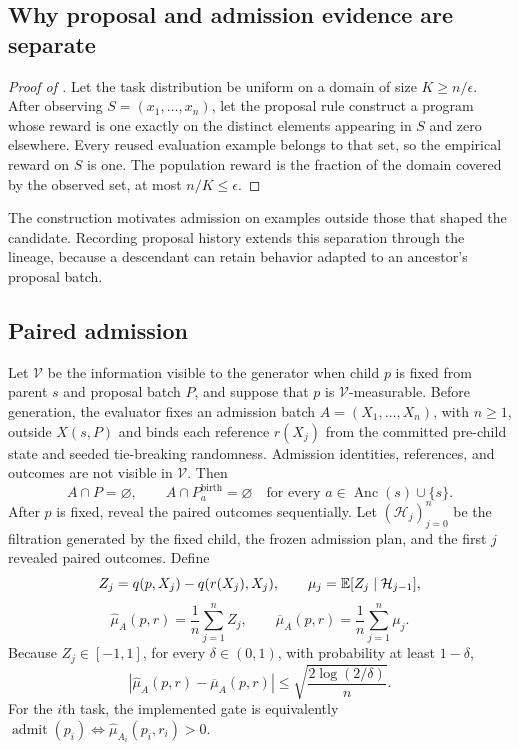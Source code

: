 \subsection{Why proposal and admission evidence are separate}

\begin{proof}[Proof of ]
Let the task distribution be uniform on a domain of size $K\ge n/\epsilon$.
After observing $S=(x_1,\ldots,x_n)$, let the proposal rule construct a program
whose reward is one exactly on the distinct elements appearing in $S$ and zero
elsewhere.  Every reused evaluation example belongs to that set, so the
empirical reward on $S$ is one.  The population reward is the fraction of the
domain covered by the observed set, at most $n/K\le\epsilon$.
\end{proof}

The construction motivates admission on examples outside those that shaped
the candidate.  Recording proposal history extends this separation through the
lineage, because a descendant can retain behavior adapted to an ancestor's
proposal batch.

\subsection{Paired admission}

\begin{theorem}
\label{thm:paired_admission}
Let $\mathcal V$ be the information visible to the generator when child $p$ is
fixed from parent $s$ and proposal batch $P$, and suppose that $p$ is
$\mathcal V$-measurable.  Before generation, the evaluator fixes an admission batch
$A=(X_1,\ldots,X_n)$, with $n\ge1$, outside $X(s,P)$ and binds each reference $r(X_j)$ from
the committed pre-child state and seeded tie-breaking randomness.  Admission
identities, references, and outcomes are not visible in $\mathcal V$.  Then
\[
A\cap P=\varnothing,
\qquad
A\cap P_a^{\mathrm{birth}}=\varnothing
\quad\text{for every }a\in\operatorname{Anc}(s)\cup\{s\}.
\]
After $p$ is fixed, reveal the paired outcomes sequentially.  Let
$(\mathcal H_j)_{j=0}^n$ be the filtration generated by the fixed child,
the frozen admission plan, and the first $j$ revealed paired outcomes.
Define
\[
Z_j=q(p,X_j)-q(r(X_j),X_j),
\qquad
\mu_j=\mathbb{E}[Z_j\mid\mathcal H_{j-1}],
\]
\[
\widehat\mu_A(p,r)=\frac1n\sum_{j=1}^n Z_j,
\qquad
\overline\mu_A(p,r)=\frac1n\sum_{j=1}^n\mu_j.
\]
Because $Z_j\in[-1,1]$, for every $\delta\in(0,1)$, with probability at
least $1-\delta$,
\begin{equation}
\left|\widehat\mu_A(p,r)-\overline\mu_A(p,r)\right|
\le
\sqrt{\frac{2\log(2/\delta)}{n}}.
\label{eq:paired_concentration}
\end{equation}
For the $i$th task, the implemented gate is equivalently
$\operatorname{admit}(p_i)\iff
\widehat\mu_{A_i}(p_i,r_i)>0$.
\end{theorem}

